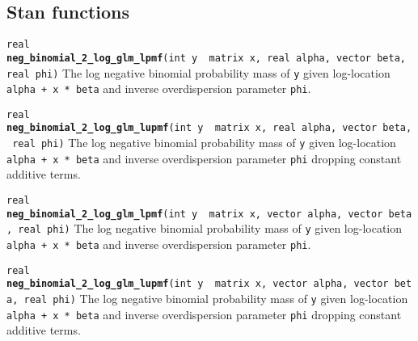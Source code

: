 \documentclass[
  10pt,
]{book}
\begin{document}
\hypertarget{stan-functions-15}{%
\subsection{Stan functions}\label{stan-functions-15}}


\texttt{real} \textbf{\texttt{neg\_binomial\_2\_log\_glm\_lpmf}}\texttt{(int\ y\ \textbar{}\ matrix\ x,\ real\ alpha,\ vector\ beta,\ real\ phi)}\newline
The log negative binomial probability mass of \texttt{y} given log-location
\texttt{alpha\ +\ x\ *\ beta} and inverse overdispersion parameter \texttt{phi}.


\texttt{real} \textbf{\texttt{neg\_binomial\_2\_log\_glm\_lupmf}}\texttt{(int\ y\ \textbar{}\ matrix\ x,\ real\ alpha,\ vector\ beta,\ real\ phi)}\newline
The log negative binomial probability mass of \texttt{y} given log-location
\texttt{alpha\ +\ x\ *\ beta} and inverse overdispersion parameter \texttt{phi}
dropping constant additive terms.


\texttt{real} \textbf{\texttt{neg\_binomial\_2\_log\_glm\_lpmf}}\texttt{(int\ y\ \textbar{}\ matrix\ x,\ vector\ alpha,\ vector\ beta,\ real\ phi)}\newline
The log negative binomial probability mass of \texttt{y} given log-location
\texttt{alpha\ +\ x\ *\ beta} and inverse overdispersion parameter \texttt{phi}.


\texttt{real} \textbf{\texttt{neg\_binomial\_2\_log\_glm\_lupmf}}\texttt{(int\ y\ \textbar{}\ matrix\ x,\ vector\ alpha,\ vector\ beta,\ real\ phi)}\newline
The log negative binomial probability mass of \texttt{y} given log-location
\texttt{alpha\ +\ x\ *\ beta} and inverse overdispersion parameter \texttt{phi}
dropping constant additive terms.
\end{document}

